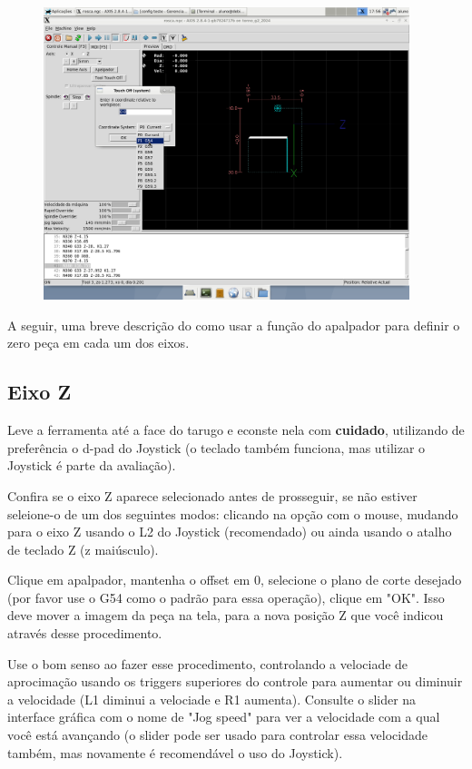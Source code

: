 \documentclass[twoside,a4paper]{refart}
\begin{document}
\begin{figure}[H]
    \begin{center}
        \includegraphics[width=0.95\textwidth]{imagens/Definicao_do_zero_peca_g54.png}
    \end{center}
    \caption{}\label{G54}
\end{figure}


A seguir, uma breve descrição do como usar a função do apalpador para definir o zero peça em cada um dos eixos.

\subsection{Eixo Z}

Leve a ferramenta até a face do tarugo e econste nela com \textbf{cuidado}, utilizando de preferência o d-pad do Joystick (o teclado também funciona, mas utilizar o Joystick é parte da avaliação). 

Confira se o eixo Z aparece selecionado antes de prosseguir, se não estiver seleione-o de um dos seguintes modos: clicando na opção com o mouse, mudando para o eixo Z usando o L2 do Joystick (recomendado) ou ainda usando o atalho de teclado Z (z maiúsculo).

Clique em apalpador, mantenha o offset em 0, selecione o plano de corte desejado (por favor use o G54 como o padrão para essa operação), clique em "OK". Isso deve mover a imagem da peça na tela, para a nova posição Z que você indicou através desse procedimento.

\attention Use o bom senso ao fazer esse procedimento, controlando a velociade de aprocimação usando os triggers superiores do controle para aumentar ou diminuir a velocidade (L1 diminui a velociade e R1 aumenta). Consulte o slider na interface gráfica com o nome de "Jog speed" para ver a velocidade com a qual você está avançando (o slider pode ser usado para controlar essa velocidade também, mas novamente é recomendável o uso do Joystick). 
\end{document}

